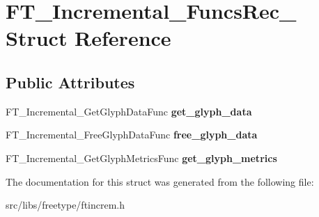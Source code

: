 \hypertarget{struct_f_t___incremental___funcs_rec__}{
\section{FT\_\-Incremental\_\-FuncsRec\_\- Struct Reference}
\label{struct_f_t___incremental___funcs_rec__}
}
\subsection*{Public Attributes}
\begin{DoxyCompactItemize}
\item 
\hypertarget{struct_f_t___incremental___funcs_rec___ac276b7ff9624b8d8bf144ab8d00538b4}{
FT\_\-Incremental\_\-GetGlyphDataFunc {\bfseries get\_\-glyph\_\-data}}
\label{struct_f_t___incremental___funcs_rec___ac276b7ff9624b8d8bf144ab8d00538b4}

\item 
\hypertarget{struct_f_t___incremental___funcs_rec___a9201afcfda8c15be839aee04306dff0a}{
FT\_\-Incremental\_\-FreeGlyphDataFunc {\bfseries free\_\-glyph\_\-data}}
\label{struct_f_t___incremental___funcs_rec___a9201afcfda8c15be839aee04306dff0a}

\item 
\hypertarget{struct_f_t___incremental___funcs_rec___ac7d95e85357ab9d1893660b0628c1908}{
FT\_\-Incremental\_\-GetGlyphMetricsFunc {\bfseries get\_\-glyph\_\-metrics}}
\label{struct_f_t___incremental___funcs_rec___ac7d95e85357ab9d1893660b0628c1908}

\end{DoxyCompactItemize}


The documentation for this struct was generated from the following file:\begin{DoxyCompactItemize}
\item 
src/libs/freetype/ftincrem.h\end{DoxyCompactItemize}
